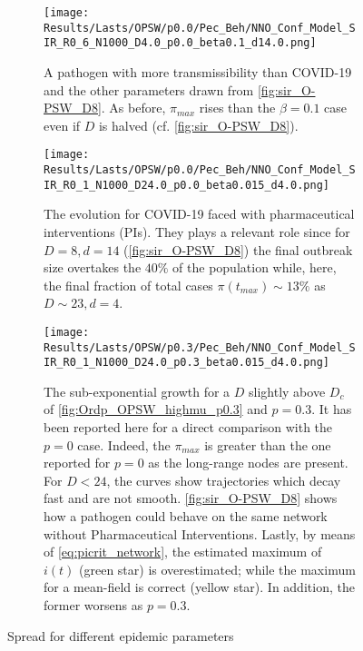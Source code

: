 \documentclass[a4paper,10pt, oneside]{book} %
\theoremstyle{definition}
\begin{document}
\clearpage
\thispagestyle{headings}
\begin{figure}[H]
	\centering
	\begin{subfigure}{.9\linewidth}
		\centering
		\texttt{[image: Results/Lasts/OPSW/p0.0/Pec\_Beh/NNO\_Conf\_Model\_SIR\_R0\_6\_N1000\_D4.0\_p0.0\_beta0.1\_d14.0.png]}
		\caption{A pathogen with more transmissibility than COVID-19 and the other parameters drawn from \autoref{fig:sir_O-PSW_D8}. As before, $\pi_{max}$ rises than the $ \beta = 0.1$ case even if $ D$ is halved (cf. \autoref{fig:sir_O-PSW_D8}).}
		\label{fig:sir_O-PSW_D4_d14_b0.1}
	\end{subfigure}
	\vfill
	\begin{subfigure}{.9\linewidth}
		\centering
		\texttt{[image: Results/Lasts/OPSW/p0.0/Pec\_Beh/NNO\_Conf\_Model\_SIR\_R0\_1\_N1000\_D24.0\_p0.0\_beta0.015\_d4.0.png]}
		\caption{The evolution for COVID-19 faced with pharmaceutical interventions (PIs). They plays a relevant role since for $ D = 8, d = 14$ (\autoref{fig:sir_O-PSW_D8}) the final outbreak size overtakes the $40 \% $ of the population while, here, the final fraction of total cases $\pi(t_{max})\sim 13\%$ as $D \sim 23, d = 4$.}
		\label{fig:sir_O-PSW_D24_d4}
	\end{subfigure}
	\vfill
	\begin{subfigure}{.9\linewidth}
		\centering
		\texttt{[image: Results/Lasts/OPSW/p0.3/Pec\_Beh/NNO\_Conf\_Model\_SIR\_R0\_1\_N1000\_D24.0\_p0.3\_beta0.015\_d4.0.png]}
		\caption{The sub-exponential growth for a $D$ slightly above $D_c$ of \autoref{fig:Ordp_OPSW_highmu_p0.3} and $p = 0.3.$ It has been reported here for a direct comparison with the $p = 0$ case. Indeed, the $ \pi_{max} $ is greater than the one reported for $ p= 0$ as the long-range nodes are present. For $ D < 24$, the curves show trajectories which decay fast and are not smooth. \autoref{fig:sir_O-PSW_D8} shows how a pathogen could behave on the same network without Pharmaceutical Interventions. Lastly, by means of \autoref{eq:picrit_network}, the estimated maximum of $ i(t)$ (green star) is overestimated; while the maximum for a mean-field is correct (yellow star). In addition, the former worsens as $ p = 0.3$.}
		\label{fig:sir_O-PSW_D24_d4_p0.3}
	\end{subfigure}
	\caption{Spread for different epidemic parameters}
	\label{fig:OPSW_COVID_p0.3}
\end{figure}

\clearpage
\thispagestyle{empty}
\end{document}
